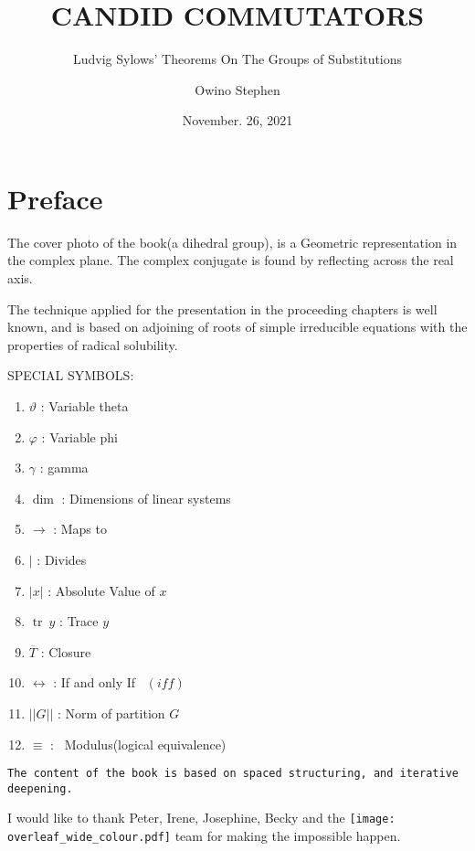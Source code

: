 \documentclass[11pt,fancy]{elegantbook}
\title{CANDID COMMUTATORS}
\subtitle{Ludvig Sylows' Theorems On The Groups of Substitutions}
\author{Owino Stephen}
\institute{\copyright \the\year{} This book was typeset using \LaTeX{} Program}
\date{November. 26, 2021}
\begin{document}
\maketitle

\frontmatter
\tableofcontents

\mainmatter
\section{Preface}

The cover photo of the book(a dihedral group), is a Geometric representation in the complex plane. The complex conjugate is found by reflecting across the real axis.
\begin{note}
The technique applied for the presentation in the proceeding chapters is well known, and is based on adjoining of roots of simple irreducible equations with the properties of radical solubility.
\end{note}
SPECIAL  SYMBOLS:
\begin{enumerate}
    \item $\vartheta$               : Variable theta
    \item $\varphi$                 : Variable phi
    \item $\gamma$                  : gamma
    \item $\dim$                    : Dimensions of linear systems
    \item $\to$                     : Maps to
    \item $|$                       : Divides
    \item $|x|$                     : Absolute Value of $x$
    \item $\operatorname{tr} \ {y}$ : Trace $y$
    \item $\overline{T}$            : Closure
    \item $\leftrightarrow$         : If and only If \ $(iff)$
    \item $||G||$                   : Norm of partition $G$
    \item $\equiv$                  : \ Modulus(logical equivalence)
\end{enumerate}

\begin{lstlisting}
The content of the book is based on spaced structuring, and iterative deepening.
\end{lstlisting}
I would like to thank Peter, Irene, Josephine, Becky and the
\texttt{[image: overleaf\_wide\_colour.pdf]} team for making the impossible happen.
\end{document}
